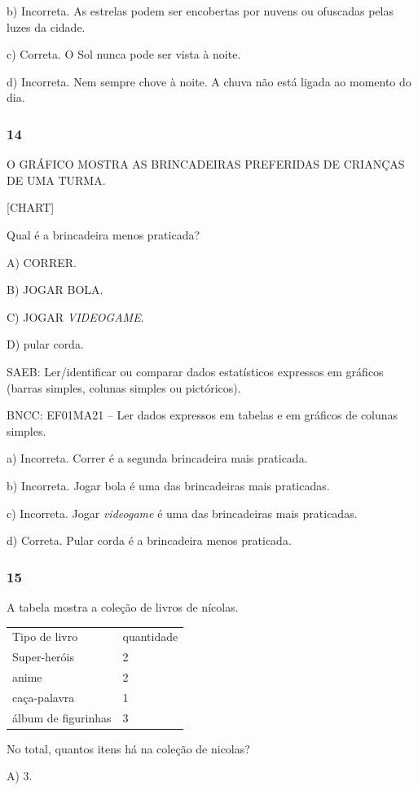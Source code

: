 \begin{itemize}
\begin{itemize}
b) Incorreta. As estrelas podem ser encobertas por nuvens ou ofuscadas pelas luzes da cidade.

c) Correta. O Sol nunca pode ser vista à noite.

d) Incorreta. Nem sempre chove à noite. A chuva não está ligada ao
momento do dia.

\subsubsection{14}\label{section-130}

O GRÁFICO MOSTRA AS BRINCADEIRAS PREFERIDAS DE CRIANÇAS DE UMA TURMA.

{{[}CHART{]}}

Qual é a brincadeira menos praticada?

A) CORRER.

B) JOGAR BOLA.

C) JOGAR \textit{VIDEOGAME}.

D) pular corda.

SAEB: Ler/identificar ou comparar dados estatísticos expressos
em gráficos (barras simples, colunas simples ou pictóricos).

BNCC: EF01MA21 -- Ler dados expressos em tabelas e em gráficos de colunas
simples.

a) Incorreta. Correr é a segunda brincadeira mais praticada.

b) Incorreta. Jogar bola é uma das brincadeiras mais praticadas.

c) Incorreta. Jogar \textit{videogame} é uma das brincadeiras mais praticadas.

d) Correta. Pular corda é a brincadeira menos praticada.

\subsubsection{15}\label{section-131}

A tabela mostra a coleção de livros de nícolas.

\begin{longtable}[]{@{}ll@{}}
\toprule
Tipo de livro & quantidade\tabularnewline
Super-heróis & 2\tabularnewline
anime & 2\tabularnewline
caça-palavra & 1\tabularnewline
álbum de figurinhas & 3\tabularnewline
\bottomrule
\end{longtable}

No total, quantos itens há na coleção de nicolas?

A) 3.


\end{itemize}
\end{itemize}
